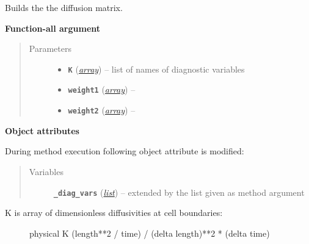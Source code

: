 \documentclass[letterpaper,10pt,english]{sphinxmanual}
\begin{document}
\begin{fulllineitems}
\label{api/climlab.dynamics:climlab.dynamics.diffusion._make_diffusion_matrix}
Builds the the diffusion matrix.

\textbf{Function-all argument}
\begin{quote}\begin{description}
\item[{Parameters}] \leavevmode\begin{itemize}
\item {} 
\textbf{\texttt{K}} (\href{http://docs.python.org/2.7/library/array.html\#module-array}{\emph{array}}) -- list of names of diagnostic variables

\item {} 
\textbf{\texttt{weight1}} (\href{http://docs.python.org/2.7/library/array.html\#module-array}{\emph{array}}) -- 

\item {} 
\textbf{\texttt{weight2}} (\href{http://docs.python.org/2.7/library/array.html\#module-array}{\emph{array}}) -- 

\end{itemize}

\end{description}\end{quote}

\textbf{Object attributes}

During method execution following object attribute is modified:
\begin{quote}\begin{description}
\item[{Variables}] \leavevmode
\textbf{\texttt{\_diag\_vars}} (\href{http://docs.python.org/2.7/library/functions.html\#list}{\emph{list}}) -- extended by the list  given as 
method argument

\end{description}\end{quote}
\begin{description}
\item[{K is array of dimensionless diffusivities at cell boundaries:}] \leavevmode
physical K (length**2 / time) / (delta length)**2 * (delta time)


\end{description}
\end{fulllineitems}
\end{document}
